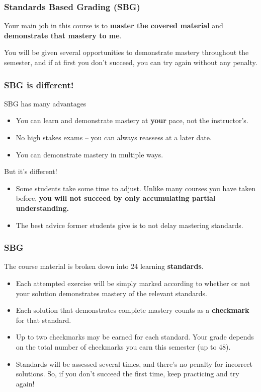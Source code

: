 \documentclass[aspectration=1610]{beamer}
\begin{document}
\begin{frame}\frametitle{Standards Based Grading (SBG)}
Your main job in this course is to \textbf{master the covered material}
and \textbf{demonstrate that mastery to me}.

\vspace{0.2in}
\pause

You will be given several opportunities to demonstrate mastery throughout
the semester, and if
at first you don't succeed, you can try again without any penalty.
\end{frame}

\begin{frame}\frametitle{SBG is different!}
SBG has many advantages
\begin{itemize}
\item You can learn and demonstrate mastery at \textbf{your} pace, not the instructor's.
\item No high stakes exams -- you can always reassess at a later date.
\item You can demonstrate mastery in multiple ways.
\end{itemize}
\vfill
But it's different!
\begin{itemize}
\item Some students take some time to adjust.  Unlike many courses you have taken before, \textbf{you will not succeed by only accumulating partial understanding.}
\item The best advice former students give is to not delay mastering standards.
\end{itemize}
\end{frame}




\begin{frame}\frametitle{SBG}
The course material is broken down into 24 learning \textbf{standards}.
\begin{itemize}
\item Each attempted exercise will be simply marked according to whether or not
      your solution demonstrates mastery of the relevant standards.
\item Each solution that demonstrates complete mastery counts as a
      \textbf{checkmark} for that standard.
\item Up to two checkmarks may be earned for each standard. Your grade depends
      on the total number of checkmarks you earn this semester (up to 48).
\item Standards will be assessed several times, and there's no penalty for
      incorrect solutions. So, if you don't succeed the first time,
      keep practicing and try again!
\end{itemize}
\end{frame}
\end{document}
